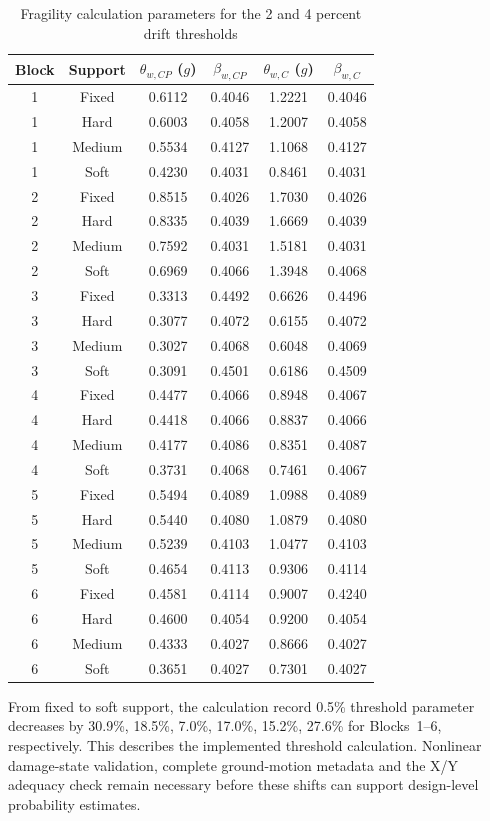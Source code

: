 \begin{table}[!htbp]
\fontsize{11}{13}\selectfont\setlength{\tabcolsep}{4pt}
\centering
\fontsize{11}{13}\selectfont\setlength{\tabcolsep}{4pt}\renewcommand{\arraystretch}{0.95}
\caption{Fragility calculation parameters for the 2 and 4 percent drift thresholds}\label{tab:seq066_frag_cp_c}\renewcommand{\arraystretch}{0.86}
\begin{tabular*}{\linewidth}{@{\extracolsep{\fill}}cccccc@{}}
\toprule
Block & Support & $\theta_{w,CP}$ ($g$) & $\beta_{w,CP}$ & $\theta_{w,C}$ ($g$) & $\beta_{w,C}$ \\
\midrule
1 & Fixed & 0.6112 & 0.4046 & 1.2221 & 0.4046 \\
1 & Hard & 0.6003 & 0.4058 & 1.2007 & 0.4058 \\
1 & Medium & 0.5534 & 0.4127 & 1.1068 & 0.4127 \\
1 & Soft & 0.4230 & 0.4031 & 0.8461 & 0.4031 \\
2 & Fixed & 0.8515 & 0.4026 & 1.7030 & 0.4026 \\
2 & Hard & 0.8335 & 0.4039 & 1.6669 & 0.4039 \\
2 & Medium & 0.7592 & 0.4031 & 1.5181 & 0.4031 \\
2 & Soft & 0.6969 & 0.4066 & 1.3948 & 0.4068 \\
3 & Fixed & 0.3313 & 0.4492 & 0.6626 & 0.4496 \\
3 & Hard & 0.3077 & 0.4072 & 0.6155 & 0.4072 \\
3 & Medium & 0.3027 & 0.4068 & 0.6048 & 0.4069 \\
3 & Soft & 0.3091 & 0.4501 & 0.6186 & 0.4509 \\
4 & Fixed & 0.4477 & 0.4066 & 0.8948 & 0.4067 \\
4 & Hard & 0.4418 & 0.4066 & 0.8837 & 0.4066 \\
4 & Medium & 0.4177 & 0.4086 & 0.8351 & 0.4087 \\
4 & Soft & 0.3731 & 0.4068 & 0.7461 & 0.4067 \\
5 & Fixed & 0.5494 & 0.4089 & 1.0988 & 0.4089 \\
5 & Hard & 0.5440 & 0.4080 & 1.0879 & 0.4080 \\
5 & Medium & 0.5239 & 0.4103 & 1.0477 & 0.4103 \\
5 & Soft & 0.4654 & 0.4113 & 0.9306 & 0.4114 \\
6 & Fixed & 0.4581 & 0.4114 & 0.9007 & 0.4240 \\
6 & Hard & 0.4600 & 0.4054 & 0.9200 & 0.4054 \\
6 & Medium & 0.4333 & 0.4027 & 0.8666 & 0.4027 \\
6 & Soft & 0.3651 & 0.4027 & 0.7301 & 0.4027 \\
\bottomrule
\end{tabular*}
\end{table}
\FloatBarrier
From fixed to soft support, the calculation record 0.5\% threshold parameter decreases by 30.9\%, 18.5\%, 7.0\%, 17.0\%, 15.2\%, 27.6\% for Blocks~1--6, respectively. This describes the implemented threshold calculation. Nonlinear damage-state validation, complete ground-motion metadata and the X/Y adequacy check remain necessary before these shifts can support design-level probability estimates.

